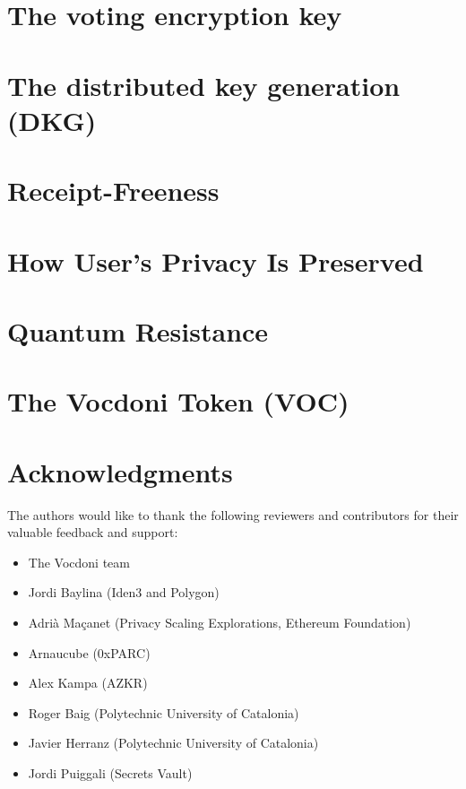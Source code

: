 \documentclass{llncs}
\begin{document}
\section{The voting encryption key}
\label{sec:voting-encryption-key}


\section{The distributed key generation (DKG)}
\label{sec:distributed-key-generation}


\section{Receipt-Freeness}
\label{sec:receipt-freeness}


\section{How User's Privacy Is Preserved}
\label{sec:user-privacy-preserving}


\section{Quantum Resistance}
\label{sec:quantum-resistance}


\section{The Vocdoni Token (VOC)}
\label{sec:vocdoni-token}


\section{Acknowledgments}

The authors would like to thank the following reviewers and contributors for their valuable feedback and support:

\begin{itemize}
	\item The Vocdoni team
	\item Jordi Baylina (Iden3 and Polygon)
	\item Adrià Maçanet (Privacy Scaling Explorations, Ethereum Foundation)
	\item Arnaucube (0xPARC)
	\item Alex Kampa (AZKR)
	\item Roger Baig (Polytechnic University of Catalonia)
	\item Javier Herranz (Polytechnic University of Catalonia)
	\item Jordi Puiggali (Secrets Vault)
\end{itemize}
\end{document}
